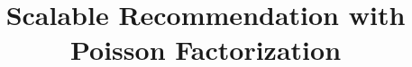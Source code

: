 \documentclass{sig-alternate}
\begin{document}
%

\title{Scalable Recommendation with Poisson Factorization}

%
%
%
%
%


%
\author{}
%
%
\end{document}
